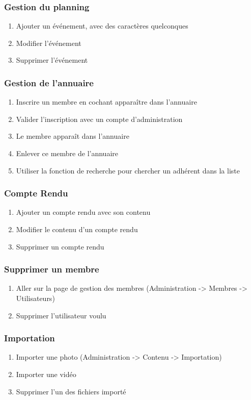 \documentclass[11pt]{report}
\begin{document}
\subsubsection*{Gestion du planning}
\begin{enumerate}
\item Ajouter un événement, avec des caractères quelconques
\item Modifier l’événement
\item Supprimer l’événement
\end{enumerate}
\subsubsection*{Gestion de l'annuaire}
\begin{enumerate}
\item Inscrire un membre en cochant \og apparaître dans l’annuaire \fg{}
\item Valider l'inscription avec un compte d'administration
\item Le membre apparaît dans l’annuaire
\item Enlever ce membre de l’annuaire
\item Utiliser la fonction de recherche pour chercher un adhérent dans la liste
\end{enumerate}
\subsubsection*{Compte Rendu}
\begin{enumerate}
\item Ajouter un compte rendu avec son contenu
\item Modifier le contenu d’un compte rendu
\item Supprimer un compte rendu
\end{enumerate}
\subsubsection*{Supprimer un membre}
\begin{enumerate}
 \item Aller sur la page de gestion des membres (Administration -> Membres -> Utilisateurs)
 \item Supprimer l'utilisateur voulu
\end{enumerate}

\subsubsection*{Importation}
\begin{enumerate}
 \item Importer une photo (Administration -> Contenu -> Importation)
 \item Importer une vidéo
 \item Supprimer l'un des fichiers importé
\end{enumerate}
\end{document}
